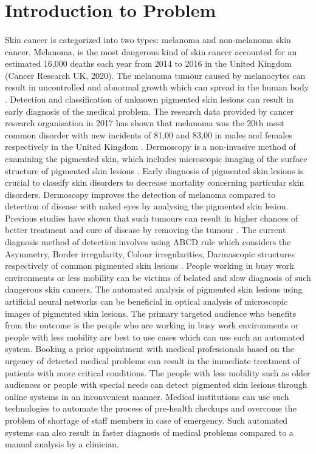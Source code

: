 \section{Introduction to Problem}
\paragraph*{}

Skin cancer is categorized into two types: melanoma and non-melanoma skin cancer. 
Melanoma, is the most dangerous kind of skin cancer accounted for an estimated 16,000 deaths 
each year from 2014 to 2016 in the United Kingdom (Cancer Research UK, 2020). 
The melanoma tumour caused by melanocytes can result in uncontrolled and abnormal growth which 
can spread in the human body \citep*{KOROTKOV201269}.
Detection and classification of unknown pigmented skin lesions can result in early diagnosis 
of the medical problem. The research data provided by cancer research organisation in 2017 has 
shown that melanoma was the 20th most common disorder with new incidents of 81,00 and 83,00 in males 
and females respectively in the United Kingdom \citep*{KOROTKOV201269}. 
Dermoscopy is a non-invasive method of examining the pigmented skin, which includes microscopic imaging of the surface structure of pigmented
skin lesions \citep*{KOROTKOV201269}.
Early diagnosis of pigmented skin lesions is crucial to classify skin disorders to decrease mortality concerning particular skin disorders. Dermoscopy improves the detection of melanoma compared to detection of disease with naked eyes by analysing the pigmented skin lesion. Previous studies have shown that such tumours can result in higher chances of better treatment and cure of disease by removing the tumour \citep*{CELEBI2007362}.
The current diagnosis method of detection involves using ABCD rule which considers the Asymmetry, Border irregularity, Colour irregularities, Darmascopic structures respectively of common pigmented skin lesions \citep*{LOESCHER2013170}.
People working in busy work environments or less mobility can be victims of belated and slow diagnosis of such dangerous skin cancers.
The automated analysis of pigmented skin lesions using artificial neural networks can be beneficial in optical analysis of microscopic images of pigmented skin lesions. 
The primary targeted audience who benefits from the outcome is the people who are working in busy work environments or people with less mobility are best to use cases which can use such an automated system. Booking a prior appointment with medical professionals based on the urgency of detected medical problems can result in the immediate treatment of patients with more critical conditions. The people with less mobility such as older audiences or people with special needs can detect pigmented skin lesions through online systems in an inconvenient manner. Medical institutions can use such technologies to automate the process of pre-health checkups and overcome the problem of shortage of staff members in case of emergency. Such automated systems can also result in faster diagnosis of medical problems compared to a manual analysis by a clinician. 
